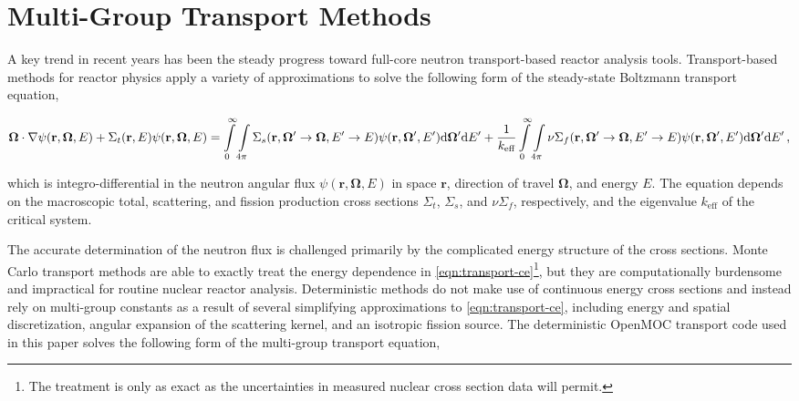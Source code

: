 \section{Multi-Group Transport Methods}
\label{sec:mg-theory}

A key trend in recent years has been the steady progress toward full-core neutron transport-based reactor analysis tools. Transport-based methods for reactor physics apply a variety of approximations to solve the following form of the steady-state Boltzmann transport equation,

\begin{dmath}
\label{eqn:transport-ce}
\mathbf{\Omega} \cdot \nabla \psi(\mathbf{r},\mathbf{\Omega},E) + \Sigma_{t}(\mathbf{r},E)\psi(\mathbf{r},\mathbf{\Omega},E) = \int\displaylimits_{0}^{\infty}\int\displaylimits_{4\pi} \Sigma_{s}(\mathbf{r},{\mathbf{\Omega'}\rightarrow\mathbf{\Omega}},{E'\rightarrow E}) \psi(\mathbf{r},\mathbf{\Omega'},E') \mathrm{d}\mathbf{\Omega'} \mathrm{d}E' + \frac{1}{k_{\textrm{eff}}}\int\displaylimits_{0}^{\infty}\int\displaylimits_{4\pi} \nu\Sigma_{f}(\mathbf{r},{\mathbf{\Omega'}\rightarrow \mathbf{\Omega}},{E'\rightarrow E})\psi(\mathbf{r},\mathbf{\Omega'},E') \mathrm{d}\mathbf{\Omega'} \mathrm{d}E'\,,
\end{dmath}

\noindent which is integro-differential in the neutron angular flux $\psi(\mathbf{r},\mathbf{\Omega},E)$ in space $\mathbf{r}$, direction of travel $\mathbf{\Omega}$, and energy $E$. The equation depends on the macroscopic total, scattering, and fission production cross sections $\Sigma_{t}$, $\Sigma_{s}$, and $\nu\Sigma_{f}$, respectively, and the eigenvalue $k_{\textrm{eff}}$ of the critical system.

The accurate determination of the neutron flux is challenged primarily by the complicated energy structure of the cross sections. Monte Carlo transport methods are able to exactly treat the energy dependence in \cref{eqn:transport-ce}\footnote{The treatment is only as exact as the uncertainties in measured nuclear cross section data will permit.}, but they are computationally burdensome and impractical for routine nuclear reactor analysis. Deterministic methods do not make use of continuous energy cross sections and instead rely on multi-group constants as a result of several simplifying approximations to \cref{eqn:transport-ce}, including energy and spatial discretization, angular expansion of the scattering kernel, and an isotropic fission source. The deterministic OpenMOC transport code used in this paper solves the following form of the multi-group transport equation,

